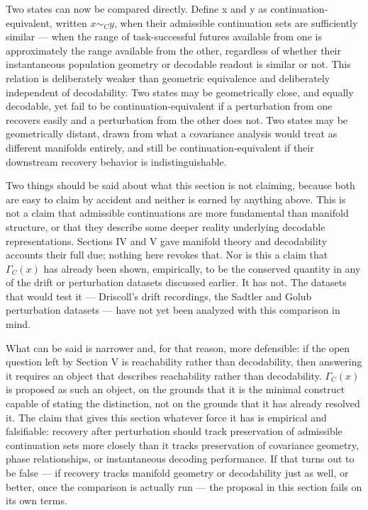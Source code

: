 \documentclass[11pt]{article}
\begin{document}
Two states can now be compared directly. Define x and y as continuation-equivalent, written $x \sim_C y$, when their admissible continuation sets are sufficiently similar — when the range of task-successful futures available from one is approximately the range available from the other, regardless of whether their instantaneous population geometry or decodable readout is similar or not. This relation is deliberately weaker than geometric equivalence and deliberately independent of decodability. Two states may be geometrically close, and equally decodable, yet fail to be continuation-equivalent if a perturbation from one recovers easily and a perturbation from the other does not. Two states may be geometrically distant, drawn from what a covariance analysis would treat as different manifolds entirely, and still be continuation-equivalent if their downstream recovery behavior is indistinguishable.

Two things should be said about what this section is not claiming, because both are easy to claim by accident and neither is earned by anything above. This is not a claim that admissible continuations are more fundamental than manifold structure, or that they describe some deeper reality underlying decodable representations. Sections IV and V gave manifold theory and decodability accounts their full due; nothing here revokes that. Nor is this a claim that $\Gamma_C(x)$ has already been shown, empirically, to be the conserved quantity in any of the drift or perturbation datasets discussed earlier. It has not. The datasets that would test it — Driscoll's drift recordings, the Sadtler and Golub perturbation datasets — have not yet been analyzed with this comparison in mind.

What can be said is narrower and, for that reason, more defensible: if the open question left by Section V is reachability rather than decodability, then answering it requires an object that describes reachability rather than decodability. $\Gamma_C(x)$ is proposed as such an object, on the grounds that it is the minimal construct capable of stating the distinction, not on the grounds that it has already resolved it. The claim that gives this section whatever force it has is empirical and falsifiable: recovery after perturbation should track preservation of admissible continuation sets more closely than it tracks preservation of covariance geometry, phase relationships, or instantaneous decoding performance. If that turns out to be false — if recovery tracks manifold geometry or decodability just as well, or better, once the comparison is actually run — the proposal in this section fails on its own terms.
\end{document}
